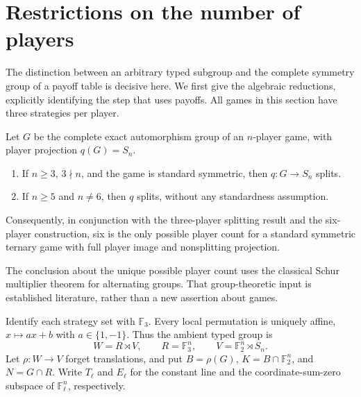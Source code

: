 \section{Restrictions on the number of players}\label{sec:06-player-counts}
\label{sec:player-counts}

The distinction between an arbitrary typed subgroup and the complete
symmetry group of a payoff table is decisive here. We first give the
algebraic reductions, explicitly identifying the step that uses payoffs.
All games in this section have three strategies per player.

\begin{theorem}\label{thm:ternary-player-counts}
Let $G$ be the complete exact automorphism group of an $n$-player game,
with player projection $q(G)=S_n$.
\begin{enumerate}
\item If $n\geq3$, $3\nmid n$, and the game is standard symmetric, then
$q:G\to S_n$ splits.
\item If $n\geq5$ and $n\neq6$, then $q$ splits, without any standardness
assumption.
\end{enumerate}
Consequently, in conjunction with the three-player splitting result and the
six-player construction, six is the only possible player count for a
standard symmetric ternary game with full player image and nonsplitting
projection.
\end{theorem}

The conclusion about the unique possible player count uses the classical
Schur multiplier theorem for alternating groups. That group-theoretic
input is established literature, rather than a new assertion about games.

Identify each strategy set with $\mathbb F_3$. Every local permutation is
uniquely affine, $x\mapsto ax+b$ with $a\in\{1,-1\}$. Thus the ambient
typed group is
\[
 W=R\rtimes V,\qquad R=\mathbb F_3^n,\qquad
 V=\mathbb F_2^n\rtimes S_n.
\]
Let $\rho:W\to V$ forget translations, and put
$B=\rho(G)$, $K=B\cap\mathbb F_2^n$, and $N=G\cap R$.
Write $T_\ell$ and $E_\ell$ for the constant line and the coordinate-sum-zero
subspace of $\mathbb F_\ell^n$, respectively.

